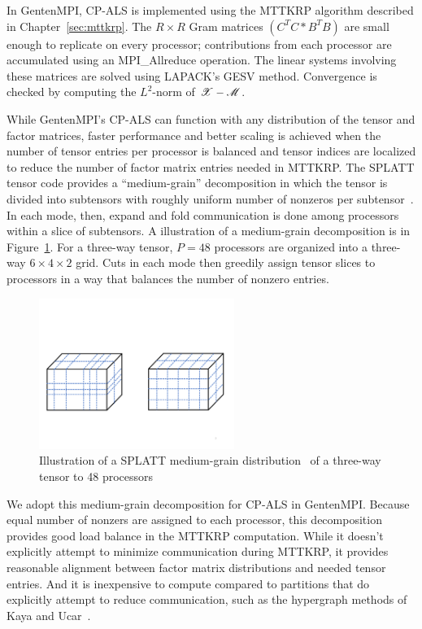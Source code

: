 In GentenMPI, CP-ALS is implemented using the MTTKRP algorithm described
in Chapter~\ref{sec:mttkrp}.  The $R \times R$ Gram matrices $(C^T C * B^T B)$
are small enough to replicate on every processor; contributions from each
processor are accumulated using an MPI\_Allreduce operation.  The 
linear systems involving these matrices are solved using LAPACK's GESV method.
Convergence is checked by computing the $L^2$-norm of $\X - \M$.

While GentenMPI's CP-ALS can function with any distribution of the tensor
and factor matrices, faster performance and better scaling is achieved when
the number of tensor entries per processor is balanced and tensor indices
are localized to reduce the number of factor matrix entries needed in MTTKRP.
The SPLATT tensor code provides a ``medium-grain'' decomposition in which
the tensor is divided into subtensors with roughly uniform number of 
nonzeros per subtensor~\cite{SK16}. 
In each mode, then, expand and fold communication is done among 
processors within a slice of subtensors.
A illustration of a medium-grain decomposition is in Figure~\ref{fig:medgrain}.
For a three-way tensor, $P=48$ processors are organized into a three-way 
$6 \times 4 \times 2$ grid.  
Cuts in each mode then greedily assign tensor slices to processors in a way
that balances the number of nonzero entries.

\begin{figure}[ht]
   \centering
   \includegraphics[keepaspectratio=true, width=2.5in]{figs/medgrain}
   \caption[SPLATT medium-grain distribution]{Illustration of a 
 SPLATT medium-grain distribution~\cite{SK16}
 of a three-way tensor to 48 processors}
   \label{fig:medgrain}
\end{figure}

We adopt this medium-grain decomposition for CP-ALS in GentenMPI. Because equal
number of nonzers are assigned to each processor, this decomposition 
provides good load balance in the MTTKRP computation.  While it doesn't 
explicitly attempt to minimize communication during MTTKRP, it provides 
reasonable alignment between factor matrix distributions and needed tensor 
entries.  And it is inexpensive to compute compared to partitions that 
do explicitly attempt to reduce communication, such as the hypergraph methods
of Kaya and Ucar~\cite{KayaUcarSC15}.

